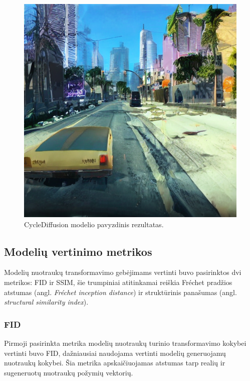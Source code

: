 \documentclass{VUMIFPSbakalaurinis}
\begin{document}
            \begin{figure}[H]
                \centering
                \includegraphics[scale=0.7]{img/diffusion/cycle/512}
                \caption{CycleDiffusion modelio pavyzdinis rezultatas.}
                \label{img:cycle}
            \end{figure}
            
    \subsection{Modelių vertinimo metrikos}
        Modelių nuotraukų transformavimo gebėjimams vertinti buvo pasirinktos dvi metrikos: FID ir SSIM, šie trumpiniai atitinkamai reiškia Fréchet pradžios atstumas (angl. \emph{Fréchet inception distance}) ir struktūrinis panašumas (angl. \emph{structural similarity index}).
        
        \subsubsection{FID}
            Pirmoji pasirinkta metrika modelių nuotraukų turinio transformavimo kokybei vertinti buvo FID, dažniausiai naudojama vertinti modelių generuojamų nuotraukų kokybei. Šia metrika apskaičiuojamas atstumas tarp realių ir sugeneruotų nuotraukų požymių vektorių.
    
\end{document}
